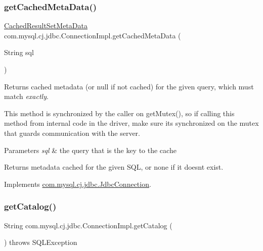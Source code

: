 \subsubsection{\texorpdfstring{get\+Cached\+Meta\+Data()}{getCachedMetaData()}}
{\footnotesize\ttfamily \mbox{\hyperlink{interfacecom_1_1mysql_1_1cj_1_1jdbc_1_1result_1_1_cached_result_set_meta_data}{Cached\+Result\+Set\+Meta\+Data}} com.\+mysql.\+cj.\+jdbc.\+Connection\+Impl.\+get\+Cached\+Meta\+Data (\begin{DoxyParamCaption}\item[{String}]{sql }\end{DoxyParamCaption})}

Returns cached metadata (or null if not cached) for the given query, which must match {\itshape exactly}.

This method is synchronized by the caller on get\+Mutex(), so if calling this method from internal code in the driver, make sure it\textquotesingle{}s synchronized on the mutex that guards communication with the server.


\begin{DoxyParams}{Parameters}
{\em sql} & the query that is the key to the cache\\
\hline
\end{DoxyParams}
\begin{DoxyReturn}{Returns}
metadata cached for the given S\+QL, or none if it doesn\textquotesingle{}t exist. 
\end{DoxyReturn}


Implements \mbox{\hyperlink{interfacecom_1_1mysql_1_1cj_1_1jdbc_1_1_jdbc_connection}{com.\+mysql.\+cj.\+jdbc.\+Jdbc\+Connection}}.

\mbox{\label{classcom_1_1mysql_1_1cj_1_1jdbc_1_1_connection_impl_a0873bb4479be9327023a37eaace6b45f}} 
\subsubsection{\texorpdfstring{get\+Catalog()}{getCatalog()}}
{\footnotesize\ttfamily String com.\+mysql.\+cj.\+jdbc.\+Connection\+Impl.\+get\+Catalog (\begin{DoxyParamCaption}{ }\end{DoxyParamCaption}) throws S\+Q\+L\+Exception}

